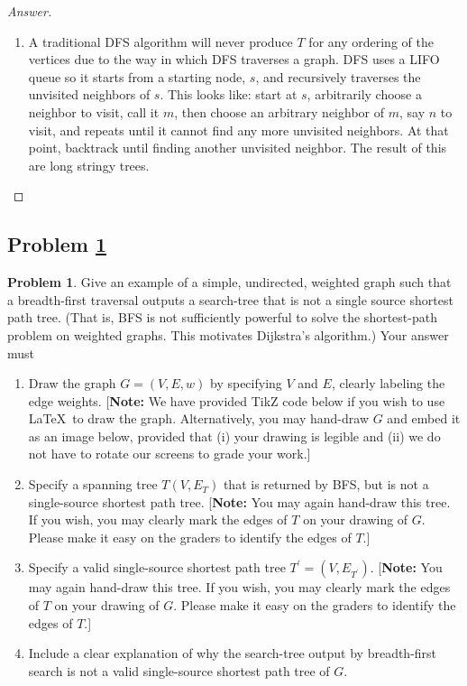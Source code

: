 \documentclass[11pt]{article}
\theoremstyle{definition}
\theoremstyle{definition}
\newtheorem{required}{Problem}
\theoremstyle{definition}
\begin{document}
\begin{proof}[Answer]
\begin{enumerate}[label=(\alph*)]
\item A traditional DFS algorithm will never produce $T$ for any ordering of the vertices due to the way in which DFS traverses a graph. DFS uses a LIFO queue so it starts from a starting node, $s$, and recursively traverses the unvisited neighbors of $s$. This looks like: start at $s$, arbitrarily choose a neighbor to visit, call it $m$, then choose an arbitrary neighbor of $m$, say $n$ to visit, and repeats until it cannot find any more unvisited neighbors. At that point, backtrack until finding another unvisited neighbor. The result of this are long stringy trees. 


\end{enumerate}
\end{proof}








\newpage
\subsection{Problem \ref{DFS4}}
\begin{required} \label{DFS4}
	Give an example of a simple, undirected, weighted graph such that a breadth-first traversal outputs a search-tree that is not a single source shortest path tree. (That is, BFS is not sufficiently powerful to solve the shortest-path problem on weighted graphs. This motivates Dijkstra's algorithm.) 
	Your answer must
	\begin{enumerate}[label=(\alph*)]
		\item Draw the graph $G = (V,E, w)$ by specifying $V$ and $E$, clearly labeling the edge weights.  [\textbf{Note:} We have provided TikZ code below if you wish to use \LaTeX \ to draw the graph. Alternatively, you may hand-draw $G$ and embed it as an image below, provided that (i) your drawing is legible and (ii) we do not have to rotate our screens to grade your work.]
		\item Specify a spanning tree $T(V, E_{T})$ that is returned by BFS, but is not a single-source shortest path tree. [\textbf{Note:} You may again hand-draw this tree. If you wish, you may clearly mark the edges of $T$ on your drawing of $G$. Please make it easy on the graders to identify the edges of $T$.] 

		\item Specify a valid single-source shortest path tree $T^{\prime} = (V,E_{T^{\prime}})$.  [\textbf{Note:} You may again hand-draw this tree. If you wish, you may clearly mark the edges of $T$ on your drawing of $G$. Please make it easy on the graders to identify the edges of $T$.] 

		\item Include a clear explanation of why the search-tree output by breadth-first search is not a valid single-source shortest path tree of $G$.
	\end{enumerate}
\end{required}
\end{document}
